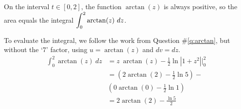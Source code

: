 \begin{enumerate}[1.]
\begin{multicols}{2}
  \begin{Solution}
    On the interval $t \in [0, 2]$, the function $\arctan(z)$ is
    always positive, so the area equals the integral $\displaystyle \int_0^2 \arctan(z)~dz$.

    To evaluate the integral, we follow the work from Question
    \#\ref{q:arctan}, but without the `7' factor, using $u =
    \arctan(z)$ and $dv = dz$.
\begin{align*}
  \int_0^2 \arctan(z)~dz & = z~\arctan(z) - \frac{1}{2} \ln|1 + z^2|  \Big|_0^2\\
& = 
\left(2 \arctan(2) - \frac{1}{2} \ln 5\right)
- \\
&\left(0 \arctan(0) - \frac{1}{2} \ln 1\right) \\
& = 2 \arctan(2) - \frac{\ln 5}{2} 
\end{align*}
  \end{Solution}

%
%    




\end{multicols}
\end{enumerate}
